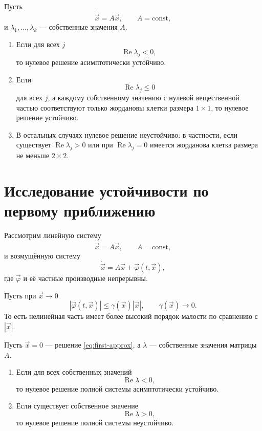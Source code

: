 \documentclass[12pt,a4paper]{article}
\numberwithin{equation}{section}
\renewcommand{\Re}{\operatorname{Re}}
\newcommand{\vect}[1]{\vec{#1}}
\begin{document}
\begin{theoremHSE}
Пусть
\[
\dot{\vect{x}}=A\vect{x},
\qquad A=\text{const},
\]
и $\lambda_1,\ldots,\lambda_k$ --- собственные значения $A$.
\begin{enumerate}
  \item Если для всех $j$
  \[
  \Re\lambda_j<0,
  \]
  то нулевое решение асимптотически устойчиво.
  \item Если
  \[
  \Re\lambda_j\le0
  \]
  для всех $j$, а каждому собственному значению с нулевой вещественной частью соответствуют только жордановы клетки размера $1\times1$, то нулевое решение устойчиво.
  \item В остальных случаях нулевое решение неустойчиво: в частности, если существует $\Re\lambda_j>0$ или при $\Re\lambda_j=0$ имеется жорданова клетка размера не меньше $2\times2$.
\end{enumerate}
\end{theoremHSE}

\section[Первое приближение]{Исследование устойчивости по первому приближению}

Рассмотрим линейную систему
\[
\dot{\vect{x}}=A\vect{x},
\qquad A=\text{const},
\]
и возмущённую систему
\begin{equation}
\dot{\vect{x}}=A\vect{x}+\vect{\varphi}(t,\vect{x}),
\label{eq:first-approx}
\end{equation}
где $\vect{\varphi}$ и её частные производные непрерывны.

Пусть при $\vect{x}\to0$
\[
|\vect{\varphi}(t,\vect{x})|
\le
\gamma(\vect{x})|\vect{x}|,
\qquad
\gamma(\vect{x})\to0.
\]
То есть нелинейная часть имеет более высокий порядок малости по сравнению с $|\vect{x}|$.

\begin{theoremHSE}
Пусть $\vect{x}=0$ --- решение \eqref{eq:first-approx}, а $\lambda$ --- собственные значения матрицы $A$.
\begin{enumerate}
  \item Если для всех собственных значений
  \[
  \Re\lambda<0,
  \]
  то нулевое решение полной системы асимптотически устойчиво.
  \item Если существует собственное значение
  \[
  \Re\lambda>0,
  \]
  то нулевое решение полной системы неустойчиво.
\end{enumerate}
\end{theoremHSE}
\end{document}
